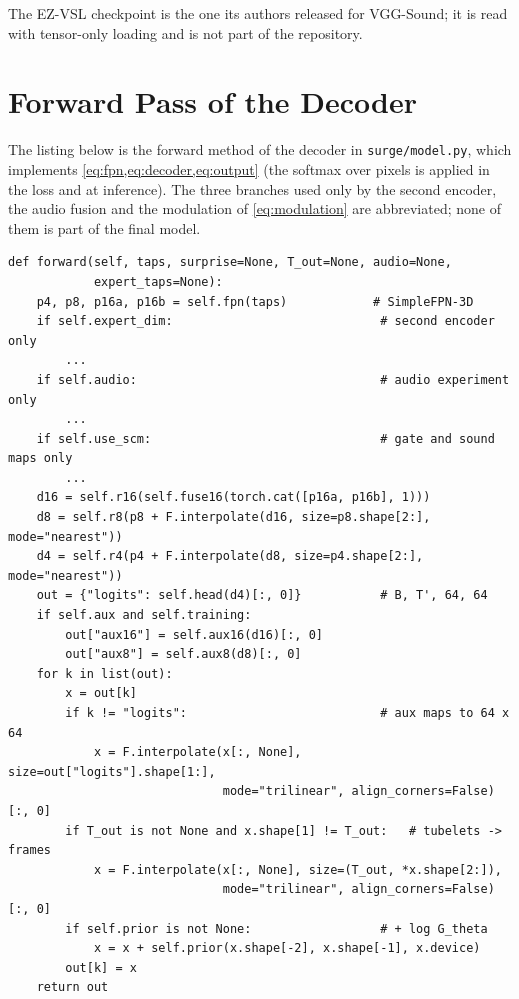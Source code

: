 \noindent The EZ-VSL checkpoint is the one its authors released for
VGG-Sound; it is read with tensor-only loading and is not part of the
repository.

\section{Forward Pass of the Decoder}

The listing below is the forward method of the decoder in
\texttt{surge/model.py}, which implements \cref{eq:fpn,eq:decoder,eq:output}
(the softmax over pixels is applied in the loss and at inference). The three
branches used only by the second encoder, the audio fusion and the modulation
of \cref{eq:modulation} are abbreviated; none of them is part of the final
model.

\begin{footnotesize}
\begin{verbatim}
def forward(self, taps, surprise=None, T_out=None, audio=None,
            expert_taps=None):
    p4, p8, p16a, p16b = self.fpn(taps)            # SimpleFPN-3D
    if self.expert_dim:                             # second encoder only
        ...
    if self.audio:                                  # audio experiment only
        ...
    if self.use_scm:                                # gate and sound maps only
        ...
    d16 = self.r16(self.fuse16(torch.cat([p16a, p16b], 1)))
    d8 = self.r8(p8 + F.interpolate(d16, size=p8.shape[2:], mode="nearest"))
    d4 = self.r4(p4 + F.interpolate(d8, size=p4.shape[2:], mode="nearest"))
    out = {"logits": self.head(d4)[:, 0]}           # B, T', 64, 64
    if self.aux and self.training:
        out["aux16"] = self.aux16(d16)[:, 0]
        out["aux8"] = self.aux8(d8)[:, 0]
    for k in list(out):
        x = out[k]
        if k != "logits":                           # aux maps to 64 x 64
            x = F.interpolate(x[:, None], size=out["logits"].shape[1:],
                              mode="trilinear", align_corners=False)[:, 0]
        if T_out is not None and x.shape[1] != T_out:   # tubelets -> frames
            x = F.interpolate(x[:, None], size=(T_out, *x.shape[2:]),
                              mode="trilinear", align_corners=False)[:, 0]
        if self.prior is not None:                  # + log G_theta
            x = x + self.prior(x.shape[-2], x.shape[-1], x.device)
        out[k] = x
    return out
\end{verbatim}
\end{footnotesize}
